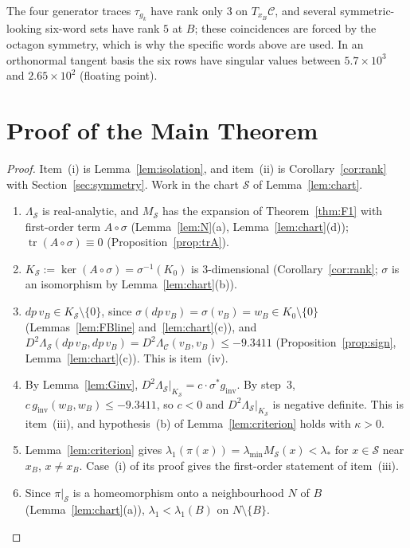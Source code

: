 \documentclass[11pt]{amsart}
\theoremstyle{definition}
\theoremstyle{remark}
\newcommand{\Oct}{\mathcal{C}}
\newcommand{\Sl}{\mathcal{S}}
\newcommand{\tr}{\operatorname{tr}}
\newcommand{\ls}{\lambda_*}
\newcommand{\gin}{g_{\mathrm{inv}}}
\newcommand{\xB}{x_B}
\newcommand{\wB}{w_B}
\newcommand{\vB}{v_B}
\begin{document}
The four generator traces $\tau_{g_k}$ have rank only $3$ on $T_{\xB}\Oct$, and several
symmetric-looking six-word sets have rank $5$ at $B$; these coincidences are forced by the octagon
symmetry, which is why the specific words above are used. In an orthonormal tangent basis the six
rows have singular values between $5.7\times10^3$ and $2.65\times10^2$ (floating point).

\section{Proof of the Main Theorem}\label{sec:proof}

\begin{proof}
Item~(i) is Lemma~\ref{lem:isolation}, and item~(ii) is Corollary~\ref{cor:rank} with
Section~\ref{sec:symmetry}. Work in the chart $\Sl$ of Lemma~\ref{lem:chart}.
\begin{enumerate}
\item $\Lambda_\Sl$ is real-analytic, and $M_\Sl$ has the expansion of Theorem~\ref{thm:F1} with first-order
term $A\circ\sigma$ (Lemma~\ref{lem:N}(a), Lemma~\ref{lem:chart}(d)); $\tr(A\circ\sigma)\equiv0$
(Proposition~\ref{prop:trA}).
\item $K_\Sl:=\ker(A\circ\sigma)=\sigma^{-1}(K_0)$ is $3$-dimensional (Corollary~\ref{cor:rank};
$\sigma$ is an isomorphism by Lemma~\ref{lem:chart}(b)).
\item $dp\,\vB\in K_\Sl\setminus\{0\}$, since $\sigma(dp\,\vB)=\sigma(\vB)=\wB\in K_0\setminus\{0\}$
(Lemmas~\ref{lem:FBline} and~\ref{lem:chart}(c)), and
$D^2\Lambda_\Sl(dp\,\vB,dp\,\vB)=D^2\Lambda_\Oct(\vB,\vB)\le-9.3411$ (Proposition~\ref{prop:sign},
Lemma~\ref{lem:chart}(c)). This is item~(iv).
\item By Lemma~\ref{lem:Ginv}, $D^2\Lambda_\Sl|_{K_\Sl}=c\cdot\sigma^*\gin$. By step~3,
$c\,\gin(\wB,\wB)\le-9.3411$, so $c<0$ and $D^2\Lambda_\Sl|_{K_\Sl}$ is negative definite. This is
item~(iii), and hypothesis~(b) of Lemma~\ref{lem:criterion} holds with $\kappa>0$.
\item Lemma~\ref{lem:criterion} gives $\lambda_1(\pi(x))=\lambda_{\min}M_\Sl(x)<\ls$ for $x\in\Sl$ near $\xB$,
$x\ne\xB$. Case~(i) of its proof gives the first-order statement of item~(iii).
\item Since $\pi|_\Sl$ is a homeomorphism onto a neighbourhood $N$ of $B$ (Lemma~\ref{lem:chart}(a)),
$\lambda_1<\lambda_1(B)$ on $N\setminus\{B\}$.\qedhere
\end{enumerate}
\end{proof}
\end{document}
